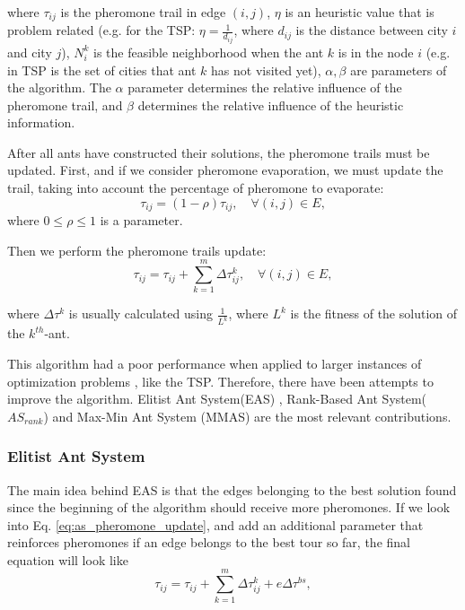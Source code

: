 		\noindent where $\tau_{ij}$ is the pheromone trail in edge $(i,j)$, $\eta$ is an heuristic value that is problem related (e.g. for the TSP: $\eta = \frac{1}{d_{ij}}$, where $d_{ij}$ is the distance between city $i$ and city $j$), $N_i^k$ is the feasible neighborhood when the ant $k$ is in the node $i$ (e.g. in TSP is the set of cities that ant $k$ has not visited yet), $\alpha, \beta$ are parameters of the algorithm. The $\alpha$ parameter determines the relative influence of the pheromone trail, and $\beta$ determines the relative influence of the heuristic information.

					After all ants have constructed their solutions, the pheromone trails must be updated. First, and if we consider pheromone evaporation, we must update the trail, taking into account the percentage of pheromone to evaporate:
					\begin{equation}
						\tau_{ij} = (1 - \rho)\tau_{ij}, \quad \forall(i,j)\in E,
					\end{equation}
		\noindent where $0 \leq \rho \leq 1$ is a parameter.

					Then we perform the  pheromone trails update:
					\begin{equation}
						\label{eq:as_pheromone_update}
						\tau_{ij} = \tau_{ij} + \sum_{k=1}^{m}\Delta\tau_{ij}^k, \quad \forall(i,j)\in E,
					\end{equation}


		\noindent where $\Delta\tau^k$ is usually calculated using $\frac{1} {L^k}$, where $L^k$ is the fitness of the solution of the $k^{th}$-ant.

					This algorithm had a poor performance when applied to larger instances of optimization problems \cite{acobook}, like the TSP. Therefore, there have been attempts to improve the algorithm. Elitist Ant System(EAS) \cite{dorigo92} \cite{dorigo96}, Rank-Based Ant System($AS_{rank}$) \cite{bullnheimer97} and Max-Min Ant System (MMAS) \cite{stutzle00} are the most relevant contributions.

					\subsubsection*{Elitist Ant System}

					The main idea behind EAS \cite{dorigo92}\cite{dorigo96} is that the edges belonging to the best solution found since the beginning of the algorithm should receive more pheromones. If we look into Eq. \eqref{eq:as_pheromone_update}, and add an additional parameter that reinforces pheromones if an edge belongs to the best tour so far, the final equation will look like
					\begin{equation}
						\label{eq:eas_pheromone_update}
						\tau_{ij} = \tau_{ij} + \sum_{k=1}^{m}\Delta\tau_{ij}^k + e\Delta\tau^{bs},
					\end{equation}

